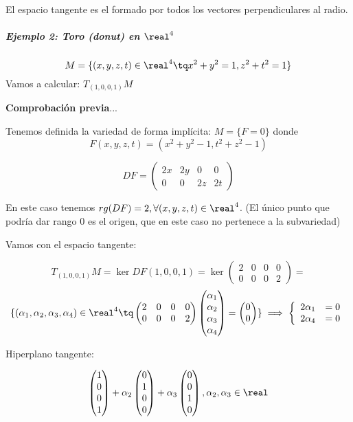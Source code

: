 El espacio tangente es el formado por todos los vectores perpendiculares al radio.

\subparagraph{Ejemplo 2: Toro (donut) en $\real^4$}

\[M = \{ (x,y,z,t)\in \real^4 \tq x^2+y^2 = 1, z^2+t^2 = 1\}\]
Vamos a calcular: $T_{(1,0,0,1)}M$

\textbf{Comprobación previa}...

Tenemos definida la variedad de forma implícita: $M = \{F = 0\}$ donde \[F(x,y,z,t) = (x^2+y^2-1,t^2+z^2-1)\]

\[DF = \begin{pmatrix}
2x&2y&0&0\\
0&0&2z&2t
\end{pmatrix}\]

En este caso tenemos $rg(DF) = 2, \forall (x,y,z,t)\in \real^4$. (El único punto que podría dar rango 0 es el origen, que en este caso no pertenece a la subvariedad)

Vamos con el espacio tangente:

\[T_{(1,0,0,1)}M = \ker DF (1,0,0,1) = \ker \begin{pmatrix}
2&0&0&0\\
0&0&0&2
\end{pmatrix} =\]
\[ \{ (\alpha_1,\alpha_2,\alpha_3,\alpha_4) \in \real^4 \tq \begin{pmatrix}
2&0&0&0\\
0&0&0&2
\end{pmatrix} \begin{pmatrix}
\alpha_1\\
\alpha_2\\ \alpha_3\\ \alpha_4
\end{pmatrix} = \begin{pmatrix}
0 \\
0
\end{pmatrix}\} \implies \left\{\begin{array}{cc}2\alpha_1 &= 0\\ 2\alpha_4 & =0\end{array}\right.\]

Hiperplano tangente:

\[
\begin{pmatrix}
1\\0\\0\\1
\end{pmatrix}
+ \alpha_2 \begin{pmatrix}
0\\1\\0\\0 	
\end{pmatrix}
+ \alpha_3
\begin{pmatrix}
0\\0\\1\\0
\end{pmatrix}, \alpha_2,\alpha_3 \in \real
\]

